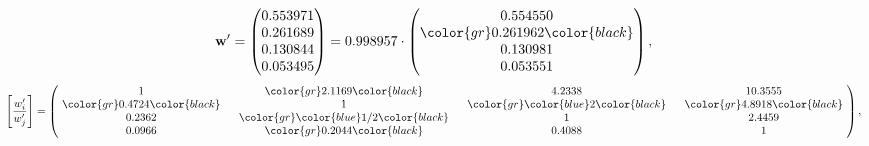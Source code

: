 \begin{example}
\begin{equation*}
\mathbf{w}^{\prime} =
\begin{pmatrix}
0.553971\\
0.261689\\
0.130844\\
0.053495
\end{pmatrix} =
0.998957\cdot
\begin{pmatrix}
0.554550\\
\color{gr} 0.261962\color{black} \\
0.130981\\
0.053551
\end{pmatrix},
\end{equation*}
\begin{equation*}
\left[ \frac{{w}^{\prime}_i}{{w}^{\prime}_j} \right] =
\begin{pmatrix}
$\,\,$ 1 $\,\,$ & $\,\,$\color{gr} 2.1169\color{black} $\,\,$ & $\,\,$4.2338$\,\,$ & $\,\,$10.3555$\,\,$ \\
$\,\,$\color{gr} 0.4724\color{black} $\,\,$ & $\,\,$ 1 $\,\,$ & $\,\,$\color{gr} \color{blue} 2\color{black} $\,\,$ & $\,\,$\color{gr} 4.8918\color{black}   $\,\,$ \\
$\,\,$0.2362$\,\,$ & $\,\,$\color{gr} \color{blue}  1/2\color{black} $\,\,$ & $\,\,$ 1 $\,\,$ & $\,\,$2.4459 $\,\,$ \\
$\,\,$0.0966$\,\,$ & $\,\,$\color{gr} 0.2044\color{black} $\,\,$ & $\,\,$0.4088$\,\,$ & $\,\,$ 1  $\,\,$ \\
\end{pmatrix},
\end{equation*}
\end{example}
\newpage
